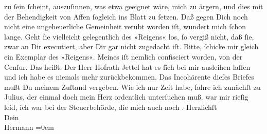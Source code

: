 \begin{ledgroupsized}[t]{13cm}
               zu ſein ſcheint, auszuſinnen, was etwa geeignet wäre, mich zu ärgern, und dies mit
               der Behendigkeit von Affen ſogleich ins Blatt zu ſetzen. Daß gegen Dich noch nicht
               eine ungeheuerliche Gemeinheit verübt worden iſt, wundert mich ſchon lange. Geht ſie
               vielleicht gelegentlich des »Reigens« los, ſo
               vergiß nicht, daß ſie, zwar an Dir executiert, aber Dir gar nicht zugedacht iſt.\pend
           \pstart
           Bitte, ſchicke mir gleich ein Exemplar des »Reigens«. Meines iſt nemlich confisciert {\pb}worden, von der Cenſur. Das heißt: Der Herr Hofrath Jettel hat es ſich bei mir ausleihen laſſen und ich habe es
               niemals mehr zurückbekommen.\pend
           \pstart
           Das Incohärente dieſes Briefes mußt Du meinem Zuſtand vergeben. Wie ich nur Zeit
               habe, fahre ich zunächſt zu Julius, der einmal
               doch mein Herz ordentlich unterſuchen muß.\pend
           \pstart
           \label{K_L01282-5v}\label{K_L01282-5h} war mir rieſig leid, ich war bei der Steuerbehörde, die mich auch noch
                  \label{K_L01282-6v}\label{K_L01282-6h}.\pend
           \pstart
           Herzlichſt{\\[\baselineskip]}Dein{\\[\baselineskip]}\spacefill\mbox{Hermann}\pend
           \leftskip=0em{}
         
         \endnumbering{}\end{ledgroupsized}  \newcommand{\dateiname}{L01282}\newcommand{\titel}{Hermann Bahr an Arthur Schnitzler, [29. 3. 1903?]}\newcommand{\editorInnen}{ Kurt Ifkovits,  Martin Anton Müller}
      